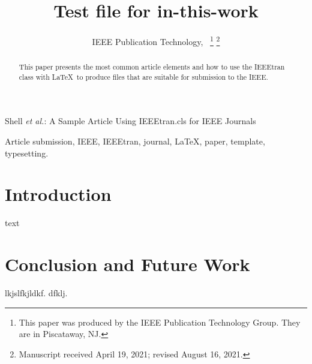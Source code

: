 \documentclass[lettersize,journal]{IEEEtran}
\begin{document}
	
	\title{Test file for in-this-work}
	
	\author{IEEE Publication Technology,~
		\thanks{This paper was produced by the IEEE Publication Technology Group. They are in Piscataway, NJ.}%
		\thanks{Manuscript received April 19, 2021; revised August 16, 2021.}}
	
	{Shell \MakeLowercase{\textit{et al.}}: A Sample Article Using IEEEtran.cls for IEEE Journals}
	
	
	\maketitle
	
	\begin{abstract}
		This paper presents the most common article elements and how to use the IEEEtran class with \LaTeX \ to produce files that are suitable for submission to the IEEE. 
	\end{abstract}
	
	\begin{IEEEkeywords}
		Article submission, IEEE, IEEEtran, journal, \LaTeX, paper, template, typesetting.
	\end{IEEEkeywords}
	
	\section{Introduction}
	text

    \section{Conclusion and Future Work}
    lkjslfkjldkf.
    dfklj.
\end{document}
